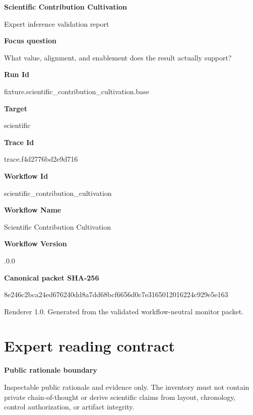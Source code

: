 \documentclass[10pt,a4paper]{article}
\newcommand{\TraceField}[2]{\par\noindent\textbf{#1}\par\noindent #2\par\smallskip}
\begin{document}
\hypersetup{pageanchor=false}
\begin{titlepage}
\centering
{\LARGE\bfseries Scientific\allowbreak{} Contributi\allowbreak{}on Cultivatio\allowbreak{}n\par}
\vspace{1em}
{\large Expert inference validation report\par}
\vspace{2em}
\begin{minipage}{0.92\linewidth}
\TraceField{Focus question}{What value, alignment,\allowbreak{} and enablement\allowbreak{} does the result actually support?}

\TraceField{Run Id}{fixture.\allowbreak{}scientific\allowbreak{}\_\allowbreak{}contributi\allowbreak{}on\_\allowbreak{}cultivatio\allowbreak{}n.\allowbreak{}base}

\TraceField{Target}{scientific\allowbreak{}}

\TraceField{Trace Id}{trace.\allowbreak{}f4d2776bd2\allowbreak{}e9d716}

\TraceField{Workflow Id}{scientific\allowbreak{}\_\allowbreak{}contributi\allowbreak{}on\_\allowbreak{}cultivatio\allowbreak{}n}

\TraceField{Workflow Name}{Scientific\allowbreak{} Contributi\allowbreak{}on Cultivatio\allowbreak{}n}

\TraceField{Workflow Version}{1.\allowbreak{}0.\allowbreak{}0}

\TraceField{Canonical packet SHA-256}{8e246c2bca\allowbreak{}24ed676240\allowbreak{}dd8a7dd68b\allowbreak{}cf6656d0c7\allowbreak{}e316501201\allowbreak{}6224c929e5\allowbreak{}e163}

\end{minipage}
\vfill
{\small Renderer 1.0. Generated from the validated workflow-neutral monitor packet.}
\end{titlepage}
\tableofcontents\clearpage
\hypersetup{pageanchor=true}
\section{Expert reading contract}\label{sec-reading-contract}
\TraceField{Public rationale boundary}{Inspectabl\allowbreak{}e public rationale and evidence only.\allowbreak{} The inventory must not contain private chain-\allowbreak{}of-\allowbreak{}thought or derive scientific\allowbreak{} claims from layout, chronology\allowbreak{}, control authorizat\allowbreak{}ion, or artifact integrity.\allowbreak{}}
\end{document}
